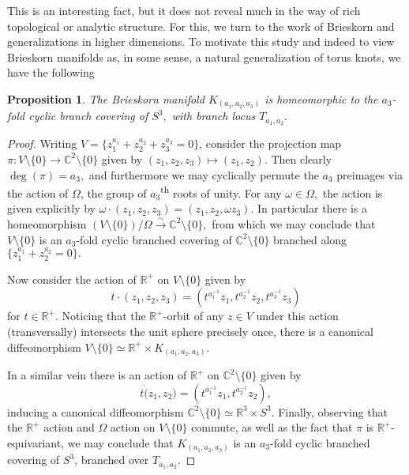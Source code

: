 \documentclass{article}
\newtheorem{proposition}{Proposition}[section]
\begin{document}
This is an interesting fact, but it does not reveal much in the way of rich topological or analytic structure. For this, we turn to the work of Brieskorn and generalizations in higher dimensions. To motivate this study and indeed to view Brieskorn manifolds as, in some sense, a natural generalization of torus knots, we have the following \cite{milnor_1975}

\begin{proposition}
The Brieskorn manifold $K_{(a_1, a_2, a_3)}$ is homeomorphic to the $a_3$-fold cyclic branch covering of $S^3,$ with branch locus $T_{a_1, a_2}.$
\end{proposition}
\begin{proof}
Writing $V = \{ z_1^{a_1} + z_2^{a_2} + z_3^{a_3} = 0\}$, consider the projection map $\pi:V \setminus \{0\} \to \mathbb{C}^2 \setminus \{0\}$ given by $(z_1, z_2, z_3) \mapsto (z_1, z_2)$. Then clearly $\deg(\pi) = a_3,$ and furthermore we may cyclically permute the $a_3$ preimages via the action of $\Omega$, the group of $a_3$\textsuperscript{th} roots of unity. For any $\omega \in \Omega,$ the action is given explicitly by $\omega \cdot (z_1, z_2, z_3) = (z_1, z_2, \omega z_3).$ In particular there is a homeomorphism $(V\setminus \{0\} )/\Omega \xrightarrow{\sim} \mathbb{C}^2 \setminus \{0\},$ from which we may conclude that $V\setminus\{0\}$ is an $a_3$-fold cyclic branched covering of $\mathbb{C}^2 \setminus \{0\}$ branched along $\{z_1^{a_1} + z_2^{a_2} = 0\}.$

Now consider the action of $\mathbb{R}^+$ on $V \setminus \{0\}$ given by \[t \cdot (z_1, z_2, z_3) = (t^{a_1^{-1}}z_1, t^{a_2^{-1}}z_2, t^{a_3^{-1}}z_3)\] for $t \in \mathbb{R}^+.$ Noticing that the $\mathbb{R}^+$-orbit of any $z \in V$ under this action (transversally) intersects the unit sphere precisely once, there is a canonical diffeomorphism $V \setminus \{0\} \simeq \mathbb{R}^+ \times K_{(a_1, a_2, a_3)}$. 

In a similar vein there is an action of $\mathbb{R}^+$ on $\mathbb{C}^2 \setminus \{0\}$ given by \[t \dot (z_1, z_2) = (t^{a_1^{-1}}z_1, t^{a_2^{-1}}z_2),\] inducing a canonical diffeomorphism $\mathbb{C}^2 \setminus \{0\} \simeq \mathbb{R}^3 \times S^3.$ Finally, observing that the $\mathbb{R}^+$ action and $\Omega$ action on $V \setminus \{0\}$ commute, as well as the fact that $\pi$ is $\mathbb{R}^+$-equivariant, we may conclude that $K_{(a_1, a_2, a_3)}$ is an $a_3$-fold cyclic branched covering of $S^3$, branched over $T_{a_1, a_2}.$

\end{proof}
\end{document}
